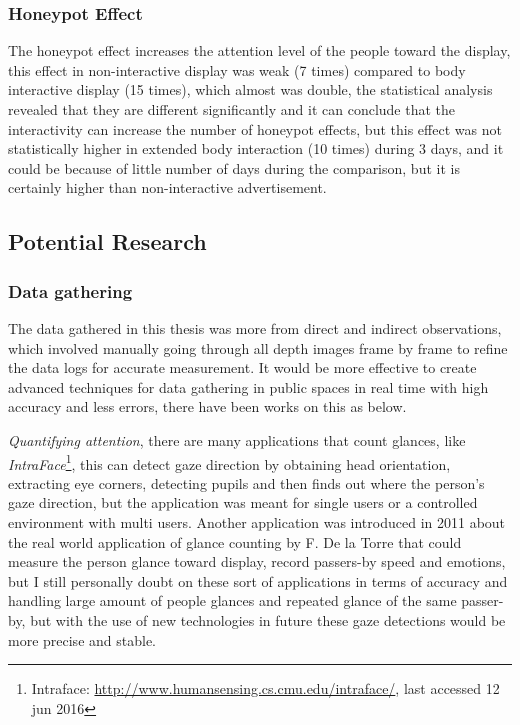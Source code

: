 \subsubsection{Honeypot Effect}
The honeypot effect increases the attention level of the people toward the display, this effect in non-interactive display was weak (7 times) compared to body interactive display (15 times), which almost was double, the statistical analysis revealed that they are different significantly and it can conclude that the interactivity can increase the number of honeypot effects, but this effect was not statistically higher in extended body interaction (10 times) during 3 days, and it could be because of little number of days during the comparison, but it is certainly higher than non-interactive advertisement. 


\subsection{Potential Research}


\subsubsection{Data gathering}

The data gathered in this thesis was more from direct and indirect observations, which involved manually going through all depth images frame by frame to refine the data logs for accurate measurement. It would be more effective to create advanced techniques for data gathering in public spaces in real time with high accuracy and less errors, there have been works on this as below.

\emph{Quantifying attention}, there are many applications that count glances, like \emph{IntraFace}\footnote{Intraface: \url{ http://www.humansensing.cs.cmu.edu/intraface/}, last accessed 12 jun 2016}\cite{Intraface}, this can detect gaze direction by obtaining head orientation, extracting eye corners, detecting pupils and then finds out where the person’s gaze direction, but the application was meant for single users or a controlled environment with multi users.  Another application was introduced in 2011 about the real world application of glance counting by F. De la Torre \cite{glancingcount} that could measure the person glance toward display, record passers-by speed and emotions, but I still personally doubt on these sort of applications in terms of accuracy and handling large amount of people glances and repeated glance of the same passer-by, but with the use of new technologies in future these gaze detections would be more precise and stable.

